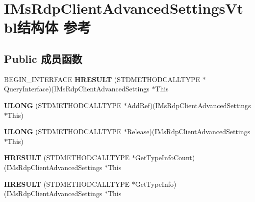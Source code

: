 \hypertarget{struct_i_ms_rdp_client_advanced_settings_vtbl}{}\section{I\+Ms\+Rdp\+Client\+Advanced\+Settings\+Vtbl结构体 参考}
\label{struct_i_ms_rdp_client_advanced_settings_vtbl}
\subsection*{Public 成员函数}
\begin{DoxyCompactItemize}
\item 
\mbox{\label{struct_i_ms_rdp_client_advanced_settings_vtbl_abf0ca0c59176438ffe0df24050d08f62}} 
B\+E\+G\+I\+N\+\_\+\+I\+N\+T\+E\+R\+F\+A\+CE {\bfseries H\+R\+E\+S\+U\+LT} (S\+T\+D\+M\+E\+T\+H\+O\+D\+C\+A\+L\+L\+T\+Y\+PE $\ast$Query\+Interface)(I\+Ms\+Rdp\+Client\+Advanced\+Settings $\ast$This
\item 
\mbox{\label{struct_i_ms_rdp_client_advanced_settings_vtbl_ac61b681c52e09cb6d62a5cc2119c24e7}} 
{\bfseries U\+L\+O\+NG} (S\+T\+D\+M\+E\+T\+H\+O\+D\+C\+A\+L\+L\+T\+Y\+PE $\ast$Add\+Ref)(I\+Ms\+Rdp\+Client\+Advanced\+Settings $\ast$This)
\item 
\mbox{\label{struct_i_ms_rdp_client_advanced_settings_vtbl_a58d362a98c14ae214c1760d3290a9aca}} 
{\bfseries U\+L\+O\+NG} (S\+T\+D\+M\+E\+T\+H\+O\+D\+C\+A\+L\+L\+T\+Y\+PE $\ast$Release)(I\+Ms\+Rdp\+Client\+Advanced\+Settings $\ast$This)
\item 
\mbox{\label{struct_i_ms_rdp_client_advanced_settings_vtbl_a3328cf258b8be43703b7c5434a20c676}} 
{\bfseries H\+R\+E\+S\+U\+LT} (S\+T\+D\+M\+E\+T\+H\+O\+D\+C\+A\+L\+L\+T\+Y\+PE $\ast$Get\+Type\+Info\+Count)(I\+Ms\+Rdp\+Client\+Advanced\+Settings $\ast$This
\item 
\mbox{\label{struct_i_ms_rdp_client_advanced_settings_vtbl_a95197b1c29bdd034864e29e387f7d948}} 
{\bfseries H\+R\+E\+S\+U\+LT} (S\+T\+D\+M\+E\+T\+H\+O\+D\+C\+A\+L\+L\+T\+Y\+PE $\ast$Get\+Type\+Info)(I\+Ms\+Rdp\+Client\+Advanced\+Settings $\ast$This

\end{DoxyCompactItemize}
